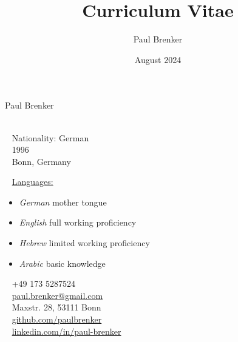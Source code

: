 \documentclass{modernsimplecv}
\title{Curriculum Vitae}
\author{Paul Brenker}
\date{August 2024}
\begin{document}
\thispagestyle{empty}




\begin{minipage}[t]{0.21\textwidth}
\vspace{0pt} %
\end{minipage}
\hfill
\begin{minipage}[t]{1\textwidth}
\vspace{0pt} %
\begin{shaded*}

\begin{minipage}[t]{0.47\textwidth}
\vspace{0pt} %
{\par\centering\huge{Paul Brenker}} \\[0.3cm]
\faGlobe~ Nationality: German\\
\faBirthdayCake~ 1996 \\
\faMapMarker~ Bonn, Germany \\
\begin{spacing}{0.5}
{\small
\faCommentsO~ \underline{Languages:} 

  \begin{itemize}
    \item \emph{German} mother tongue
    \item \emph{English} full working proficiency
    \item \emph{Hebrew} limited working proficiency
    \item \emph{Arabic} basic knowledge
  \end{itemize}
}
\end{spacing}
\vspace{4pt} %
\end{minipage}\hfill
\begin{minipage}[t]{0.46\textwidth}
\vspace{29pt} %
\faPhone~ +49 173 5287524 \\
\faAt~ \protect\url{paul.brenker@gmail.com} \\

\faEnvelopeO~ Maxstr. 28, 53111 Bonn \\ 

\faGithub~ \protect\url{github.com/paulbrenker} \\
\faLinkedin~ \protect\url{linkedin.com/in/paul-brenker} \\
\end{minipage}
\hfill
\end{shaded*}
\end{minipage}\\[15pt]
\end{document}
